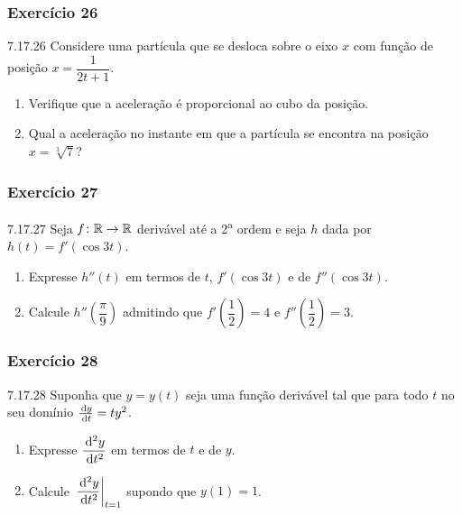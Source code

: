\subsubsection*{Exercício 26}
\begin{exercicio}[26]{7.17.26}
Considere uma partícula que se desloca sobre o eixo $x$ com função de posição $x = \dfrac{1}{2t + 1}$.
\begin{enumerate}[label=\alph*)]
    \item Verifique que a aceleração é proporcional ao cubo da posição.
    \item Qual a aceleração no instante em que a partícula se encontra na posição $x = \sqrt[3]{7}$?
\end{enumerate}
\end{exercicio}

\subsubsection*{Exercício 27}
\begin{exercicio}[27]{7.17.27}
Seja $f\colon \mathbb{R} \to \mathbb{R}$ derivável até a 2\textsuperscript{a} ordem e seja $h$ dada por $h(t) = f'(\cos 3t)$.
\begin{enumerate}[label=\alph*)]
    \item Expresse $h''(t)$ em termos de $t$, $f'(\cos 3t)$ e de $f''(\cos 3t)$.
    \item Calcule $h''\!\left(\dfrac{\pi}{9}\right)$ admitindo que $f'\!\left(\dfrac{1}{2}\right) = 4$ e $f''\!\left(\dfrac{1}{2}\right) = 3$.
\end{enumerate}
\end{exercicio}

\subsubsection*{Exercício 28}
\begin{exercicio}[28]{7.17.28}
Suponha que $y = y(t)$ seja uma função derivável tal que para todo $t$ no seu domínio $\frac{\,\mathrm{d} y}{\,\mathrm{d} t} = ty^2$.
\begin{enumerate}[label=\alph*)]
    \item Expresse $\dfrac{\,\mathrm{d}^2 y}{\,\mathrm{d} t^2}$ em termos de $t$ e de $y$.
    \item Calcule $\left.\dfrac{\,\mathrm{d}^2 y}{\,\mathrm{d} t^2}\right|_{t = 1}$ supondo que $y(1) = 1$.
\end{enumerate}
\end{exercicio}

